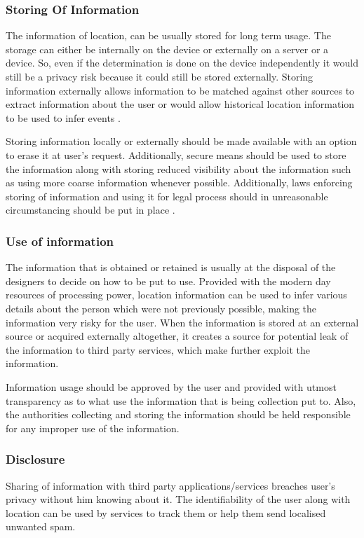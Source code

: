 \documentclass[12pt]{report}
\begin{document}
\subsubsection{Storing Of Information}
The information of location, can be usually stored for long term usage. The storage can either be internally on the device or externally on a server or a device. So, even if the determination is done on the device independently it would still be a privacy risk because it could still be stored externally. Storing information externally allows information to be matched against other sources to extract information about the user or would allow historical location information to be used to infer events \cite{minch2004privacy}.

Storing information locally or externally should be made available with an option to erase it at user's request. Additionally, secure means should be used to store the information along with storing reduced visibility about the information such as using more coarse information whenever possible. Additionally, laws enforcing storing of information and using it for legal process should in unreasonable circumstancing should be put in place \cite{minch2004privacy}. 




\subsubsection{Use of information}
The information that is obtained or retained is usually at the disposal of the designers to decide on how to be put to use. Provided with the modern day resources of processing power, location information can be used to infer various details about the person which were not previously possible, making the information very risky for the user. When the information is stored at an external source or acquired externally altogether, it creates 
a source for potential leak of the information to third party services, which make further exploit the information.

Information usage should be approved by the user and provided with utmost transparency as to what use the information that is being collection put to. Also, the authorities collecting and storing the information should be held responsible for any improper use of the information.

\subsubsection{Disclosure}
Sharing of information with third party applications/services breaches user's privacy without him knowing about it. The identifiability of the user along with location can be used by services to track them or help them send localised unwanted spam.
\end{document}
